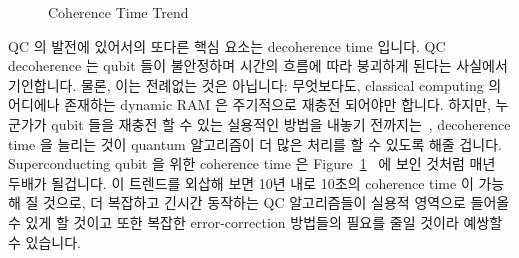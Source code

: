 \begin{figure}[tb]
\centering
{}
\caption{Coherence Time Trend}
\label{fig:future:Coherence Time Trend}
\end{figure}

QC 의 발전에 있어서의 또다른 핵심 요소는 decoherence time 입니다.
QC decoherence 는 qubit 들이 불안정하며 시간의 흐름에 따라 붕괴하게 된다는
사실에서 기인합니다.
물론, 이는 전례없는 것은 아닙니다: 무엇보다도, classical computing 의 어디에나
존재하는 dynamic RAM 은 주기적으로 재충전 되어야만 합니다.
하지만, 누군가가 qubit 들을 재충전 할 수 있는 실용적인 방법을 내놓기
전까지는~\cite{GiorgioColangelo2017QC-SpinAngleAmplitude},
decoherence time 을 늘리는 것이 quantum 알고리즘이 더 많은 처리를 할 수 있도록
해줄 겁니다.
Superconducting qubit 을 위한 coherence time 은
Figure~\ref{fig:future:Coherence Time Trend}~\cite{IBM2016QuantumExperience}
에 보인 것처럼 매년 두배가 될겁니다.
이 트렌드를 외삽해 보면 10년 내로 10초의 coherence time 이 가능해 질 것으로, 더
복잡하고 긴시간 동작하는 QC 알고리즘들이 실용적 영역으로 들어올 수 있게 할
것이고 또한 복잡한 error-correction 방법들의 필요를 줄일 것이라 예쌍할 수
있습니다.
\iffalse

